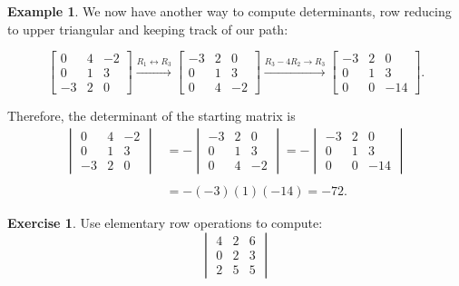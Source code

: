 \documentclass{beamer}
\newcommand{\fn}{\insertframenumber}
\theoremstyle{definition}
\newtheorem{exercise}{Exercise}
\newtheorem*{exa}{Example}
\begin{document}
\begin{frame}{\fn}
	\begin{exa}
		We now have another way to compute determinants, row reducing to upper triangular and keeping track of our path:
		
		\[
		\begin{bmatrix}0 & 4 & -2 \\0 & 1 & 3 \\-3 & 2 & 0\end{bmatrix}
		\xrightarrow{R_1\leftrightarrow R_3}
		\begin{bmatrix}-3 & 2 & 0\\0 & 1 & 3 \\0 & 4 & -2 \end{bmatrix}
		\xrightarrow{R_3-4R_2\rightarrow R_3}
		\begin{bmatrix}-3 & 2 & 0\\0 & 1 & 3 \\0 & 0 & -14 \end{bmatrix}.
		\]
		
		Therefore, the determinant of the starting matrix is
		\[\begin{array}{rl}\begin{vmatrix}0 & 4 & -2 \\0 & 1 & 3 \\-3 & 2 & 0\end{vmatrix}
		&=-
		\begin{vmatrix}-3 & 2 & 0\\0 & 1 & 3 \\0 & 4 & -2 \end{vmatrix}
		=-
		\begin{vmatrix}-3 & 2 & 0\\0 & 1 & 3 \\0 & 0 & -14 \end{vmatrix}\\\\
		&=
		-(-3)(1)(-14)=-72.
		\end{array}\]
	\end{exa}
\end{frame}
\begin{frame}{\fn}
	\begin{exercise}
		Use elementary row operations to compute:
			\[\begin{vmatrix}
			4 & 2 & 6 \\
			0 & 2 & 3 \\
			2 & 5 & 5
			\end{vmatrix}\]
	\end{exercise}
\end{frame}
\end{document}
